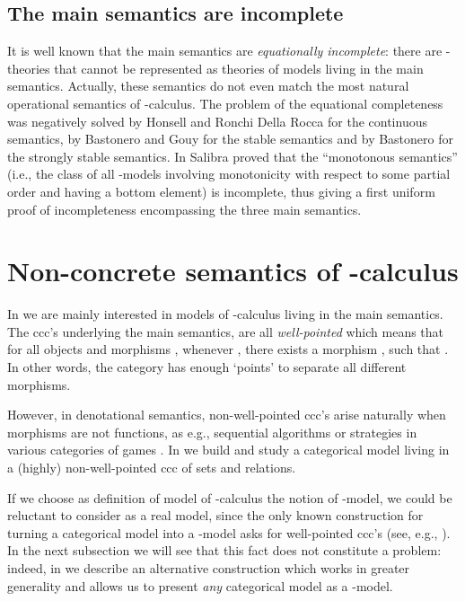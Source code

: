 \documentclass[english]{llncs}
\begin{document}
\subsection{The main semantics are incomplete} 

It is well known that the main semantics are {\em equationally incomplete}: 
there are -theories that cannot be represented as theories of models living in the main semantics.
Actually, these semantics do not even match the most natural operational semantics of -calculus.
The problem of the equational completeness was negatively solved by Honsell and Ronchi Della Rocca \cite{HonsellR92} for the 
continuous semantics, by Bastonero and Gouy \cite{BastoneroG99,GouyTh} for the stable semantics and by Bastonero \cite{BastoneroTh} for the strongly stable semantics.
In \cite{Salibra01,Salibra03} Salibra proved that the ``monotonous semantics'' (i.e., the class of all -models involving monotonicity with 
respect to some partial order and having a bottom element) is incomplete, thus giving a first uniform proof of incompleteness encompassing the three 
main semantics.



\section{Non-concrete semantics of -calculus}\label{sec:Non-concrete semantics of lambda-calculus}

In \cite{ManzonettoTh} we are mainly interested in models of -calculus living in the main semantics. 
The ccc's underlying the main semantics, are all {\em well-pointed} which means that for all objects  and 
morphisms , whenever , there exists a morphism , such that . 
In other words, the category has enough `points' to separate all different morphisms.

However, in denotational semantics, non-well-pointed ccc's arise naturally when morphisms are not functions, as e.g., 
sequential algorithms \cite{BerryC85} or strategies in various categories of games \cite{AbramskyJM00,HylandO00}. 
In \cite[Chapter~3]{ManzonettoTh} we build and study a categorical model  living in a (highly) non-well-pointed ccc of 
sets and relations. 

If we choose as definition of model of -calculus the notion of -model, we could be reluctant to consider  as a real model, 
since the only known construction for turning a categorical model into a -model asks for well-pointed ccc's (see, e.g., \cite[Ch.~5]{Bare}).
In the next subsection we will see that this fact does not constitute a problem: 
indeed, in \cite[Chapter~2]{ManzonettoTh} we describe an alternative construction which works in greater generality and allows us to present 
{\em any} categorical model as a -model.
\end{document}

